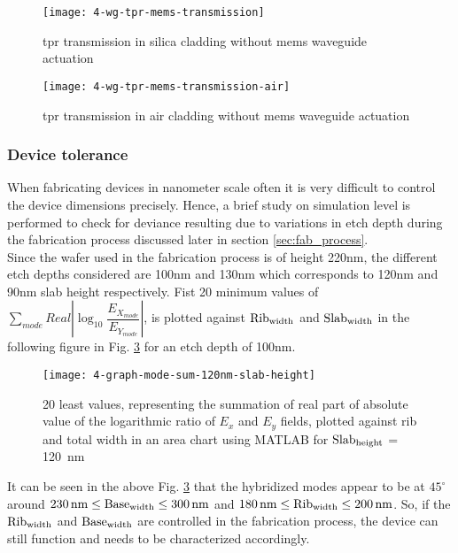 \documentclass[../report.tex]{subfiles}
\begin{document}
\begin{figure}[H] %
	\centering
	\texttt{[image: 4-wg-tpr-mems-transmission]}
	\caption{\gls{tpr} transmission in silica cladding without \gls{mems} waveguide actuation}
	\label{fig:4_wg_tpr_mems_transmission}
\end{figure}

\begin{figure}[H] %
	\centering
	\texttt{[image: 4-wg-tpr-mems-transmission-air]}
	\caption{\gls{tpr} transmission in air cladding without \gls{mems} waveguide actuation}
	\label{fig:4_wg_tpr_mems_transmission_air}
\end{figure}

\subsubsection{Device tolerance}
When fabricating devices in nanometer scale often it is very difficult to control the device dimensions precisely. Hence, a brief study on simulation level is performed to check for deviance resulting due to variations in etch depth during the fabrication process discussed later in section \ref{sec:fab_process}.\\  

Since the wafer used in the fabrication process is of height 220nm, the different etch depths considered are 100nm and 130nm which corresponds to 120nm and 90nm slab height respectively. Fist 20 minimum values of $\sum _{mode}Real\left| \log _{10}\dfrac {E_{X_{mode}}} {E_{Y_{mode}}}\right|$, is plotted against $\mathrm{Rib_{width}}$ and $\mathrm{Slab_{width}}$ in the following figure in Fig. \ref{fig:4_graph_mode_sum_120nm_slab_height} for an etch depth of 100nm. 

\begin{figure}[H] %
	\centering
	\texttt{[image: 4-graph-mode-sum-120nm-slab-height]}
	\caption{20 least values, representing the summation of real part of absolute value of the logarithmic ratio of $E_x$ and $E_y$ fields, plotted against rib and total width in an area chart using MATLAB for $\mathrm{Slab_{height}}$ = \SI{120}{\nano \meter}}
	\label{fig:4_graph_mode_sum_120nm_slab_height}
\end{figure}
\noindent It can be seen in the above Fig. \ref{fig:4_graph_mode_sum_120nm_slab_height} that the hybridized modes appear to be at $45^{\circ}$ around $\mathrm{\SI{230}{\nano \meter} \leq Base_{width} \leq \SI{300}{\nano \meter}}$ and $\mathrm{\SI{180}{\nano \meter} \leq Rib_{width} \leq \SI{200}{\nano \meter}}$. So, if the $\mathrm{Rib_{width}}$ and $\mathrm{Base_{width}}$ are controlled in the fabrication process, the device can still function and needs to be characterized accordingly.\\
\end{document}
